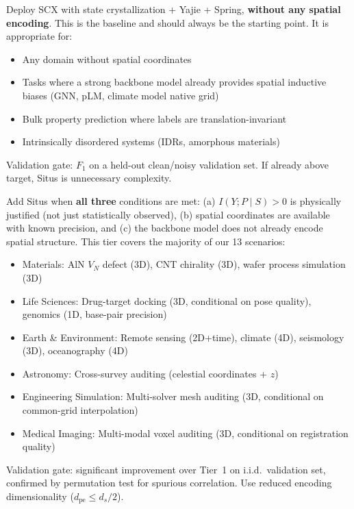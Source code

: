 \documentclass[12pt,a4paper]{article}
\begin{document}
\begin{description}[leftmargin=2cm,style=nextline]

\item[\textbf{Tier 1 — Core (No Situs)}.] Deploy SCX with state crystallization + Yajie + Spring, \textbf{without any spatial encoding}. This is the baseline and should always be the starting point. It is appropriate for:
\begin{itemize}[nosep]
\item Any domain without spatial coordinates
\item Tasks where a strong backbone model already provides spatial inductive biases (GNN, pLM, climate model native grid)
\item Bulk property prediction where labels are translation-invariant
\item Intrinsically disordered systems (IDRs\cite{dunker2005}, amorphous materials)
\end{itemize}
Validation gate: $F_1$ on a held-out clean/noisy validation set. If already above target, Situs is unnecessary complexity.

\item[\textbf{Tier 2 — Spatial (+Situs)}.] Add Situs when \textbf{all three} conditions are met: (a) $I(Y;P \mid S) > 0$ is physically justified (not just statistically observed), (b) spatial coordinates are available with known precision, and (c) the backbone model does not already encode spatial structure. This tier covers the majority of our 13 scenarios:
\begin{itemize}[nosep]
\item Materials: AlN $V_N$ defect (3D), CNT chirality (3D), wafer process simulation (3D)
\item Life Sciences: Drug-target docking (3D, conditional on pose quality), genomics (1D, base-pair precision)
\item Earth \& Environment: Remote sensing (2D+time), climate (4D), seismology (3D), oceanography (4D)
\item Astronomy: Cross-survey auditing (celestial coordinates + $z$)
\item Engineering Simulation: Multi-solver mesh auditing (3D, conditional on common-grid interpolation)
\item Medical Imaging: Multi-modal voxel auditing (3D, conditional on registration quality)
\end{itemize}
Validation gate: significant improvement over Tier~1 on i.i.d.\ validation set, confirmed by permutation test for spurious correlation. Use reduced encoding dimensionality ($d_{\text{pe}} \leq d_s/2$).


\end{description}
\end{document}
